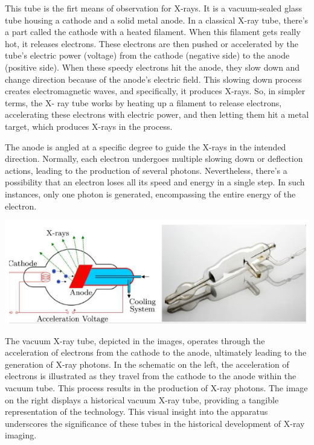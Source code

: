 \documentclass[a4paper,12pt]{report}
\begin{document}
This tube is the firt means of observation for X-rays. It is a vacuum-sealed glass
tube housing a cathode and a solid metal anode. In a classical X-ray tube, there's a part called the
cathode with a heated filament. When this filament gets really hot, it releases electrons. These
electrons are then pushed or accelerated by the tube's electric power (voltage) from the cathode
(negative side) to the anode (positive side). When these speedy electrons hit the anode, they slow
down and change direction because of the anode's electric field. This slowing down process
creates electromagnetic waves, and specifically, it produces X-rays. So, in simpler terms, the X-
ray tube works by heating up a filament to release electrons, accelerating these electrons with
electric power, and then letting them hit a metal target, which produces X-rays in the process.

The anode is angled at a specific degree to guide the X-rays in the intended direction. Normally,
each electron undergoes multiple slowing down or deflection actions, leading to the production of
several photons. Nevertheless, there's a possibility that an electron loses all its speed and energy
in a single step. In such instances, only one photon is generated, encompassing the entire energy
of the electron.

\begin{center}
  \includegraphics[scale = 1.5 ]{modernTube.png}
  \label{modernTube}
\end{center}


The vacuum X-ray tube, depicted in the images, operates through the acceleration of electrons
from the cathode to the anode, ultimately leading to the generation of X-ray photons. In the
schematic on the left, the acceleration of electrons is illustrated as they travel from the cathode to
the anode within the vacuum tube. This process results in the production of X-ray photons. The
image on the right displays a historical vacuum X-ray tube, providing a tangible representation of
the technology. This visual insight into the apparatus underscores the significance of these tubes
in the historical development of X-ray imaging.
\end{document}
